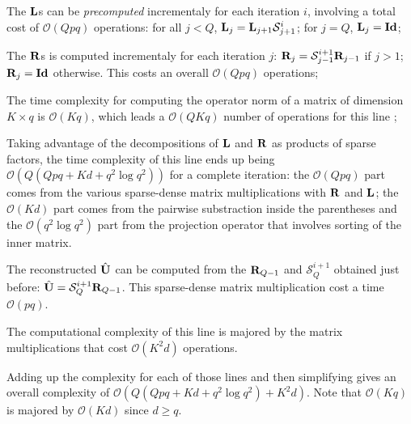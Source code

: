 \begin{description}[leftmargin=\parindent,labelindent=\parindent]
 
 \item [Line 3] The ${\mathbf{L}}$s can be \textit{precomputed} incrementaly for each iteration $i$, involving a total cost of $\mathcal{O}(Qpq)$ operations: for all $j < Q$, ${\mathbf{L}}_j = {\mathbf{L}}_{j+1} \mathcal{S}^i_{j+1}$; for $j = Q$, ${\mathbf{L}}_j = \textbf{Id}$;
 \item [Line 4] The ${\mathbf{R}}$s is computed incrementaly for each iteration $j$: ${\mathbf{R}}_j = \mathcal{S}^{i+1}_{j-1} {\mathbf{R}}_{j-1}$ if $j > 1$; ${\mathbf{R}}_j = \textbf{Id}$ otherwise. This costs an overall $\mathcal{O}(Qpq)$ operations;
 \item [Line 5] The time complexity for computing the operator norm of a matrix of dimension $K \times q$ is $\mathcal{O}(Kq)$, which leads a $\mathcal{O}(QKq)$ number of operations for this line ;
 \item [Line 6]  Taking advantage of the decompositions of ${\mathbf{L}}$ and ${\mathbf{R}}$ as products of sparse factors, the time complexity of this line ends up being $\mathcal{O}(Q(Qpq + Kd + q^2\log q^2))$ for a complete iteration: the $\mathcal{O}(Qpq)$ part comes from the various sparse-dense matrix multiplications with ${\mathbf{R}}$ and ${\mathbf{L}}$; the $\mathcal{O}(Kd)$ part comes from the pairwise substraction inside the parentheses and the $\mathcal{O}(q^2 \log q^2)$ part from the projection operator that involves sorting of the inner matrix.
 \item [Line 8] The reconstructed $\hat {{\mathbf{U}}}$ can be computed from the ${\mathbf{R}}_{Q-1}$ and $\mathcal{S}_Q^{i+1}$ obtained just before: $\hat {{\mathbf{U}}} = \mathcal{S}_Q^{i+1} {\mathbf{R}}_{Q-1}$. This sparse-dense matrix multiplication cost a time $\mathcal{O}(pq)$.
 \item [Line 9] The computational complexity of this line is majored by the matrix multiplications that cost $\mathcal{O}(K^2d)$ operations.
\end{description}

Adding up the complexity for each of those lines and then simplifying gives an overall complexity of $\mathcal{O}(Q(Qpq + Kd + q^2\log q^2) + K^2d)$. Note that $\mathcal{O}(Kq)$ is majored by $\mathcal{O}(Kd)$ since $d \geq q$.
